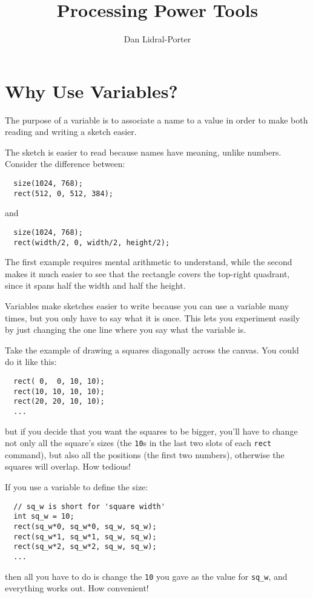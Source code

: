\documentclass[
]{leaflet}
\title{Processing Power Tools\vspace{-2ex}}
\author{%
  Dan Lidral-Porter\vspace{-2ex}
}
\date{}
\begin{document}


\maketitle
\thispagestyle{empty}


\section{Why Use Variables?}

The purpose of a variable is to associate a name to a value in order to make both reading and writing a sketch easier.

The sketch is easier to read because names have meaning, unlike numbers.
Consider the difference between:
\begin{lstlisting}
  size(1024, 768);
  rect(512, 0, 512, 384);
\end{lstlisting}
\vspace{-0.5em}
and
\begin{lstlisting}
  size(1024, 768);
  rect(width/2, 0, width/2, height/2);
\end{lstlisting}
The first example requires mental arithmetic to understand, while the second makes it much easier to see that the rectangle covers the top-right quadrant, since it spans half the width and half the height.

Variables make sketches easier to write because you can use a variable many times, but you only have to say what it is once.
This lets you experiment easily by just changing the one line where you say what the variable is.

Take the example of drawing a squares diagonally across the canvas.
You could do it like this:
\begin{lstlisting}
  rect( 0,  0, 10, 10);
  rect(10, 10, 10, 10);
  rect(20, 20, 10, 10);
  ...
\end{lstlisting}
but if you decide that you want the squares to be bigger, you'll have to change not only all the square's sizes (the \texttt{10}s in the last two slots of each \texttt{rect} command), but also all the positions (the first two numbers), otherwise the squares will overlap.
How tedious!

If you use a variable to define the size:
\begin{lstlisting}
  // sq_w is short for 'square width'
  int sq_w = 10;
  rect(sq_w*0, sq_w*0, sq_w, sq_w);
  rect(sq_w*1, sq_w*1, sq_w, sq_w);
  rect(sq_w*2, sq_w*2, sq_w, sq_w);
  ...
\end{lstlisting}
then all you have to do is change the \texttt{10} you gave as the value for \texttt{sq\_w}, and everything works out.
How convenient!
\vspace{-1.5em}
\end{document}
